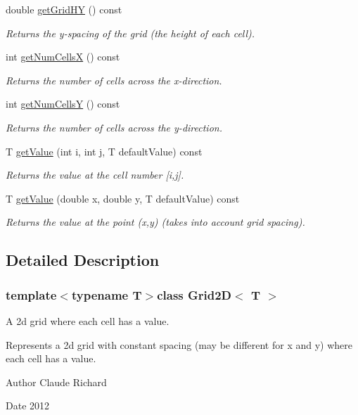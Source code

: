 \begin{DoxyCompactItemize}
double \hyperlink{class_grid2_d_a23b8af0f8e33c530bd1afbc5c77c50e2}{get\-Grid\-H\-Y} () const 
\begin{DoxyCompactList}\small\item\em Returns the y-\/spacing of the grid (the height of each cell). \end{DoxyCompactList}\item 
int \hyperlink{class_grid2_d_a2b6c57bd0364ec5ec86ac5adf84bcbc5}{get\-Num\-Cells\-X} () const 
\begin{DoxyCompactList}\small\item\em Returns the number of cells across the x-\/direction. \end{DoxyCompactList}\item 
int \hyperlink{class_grid2_d_aaa3fd3dbe8e175ae01bf51af3dac72bc}{get\-Num\-Cells\-Y} () const 
\begin{DoxyCompactList}\small\item\em Returns the number of cells across the y-\/direction. \end{DoxyCompactList}\item 
T \hyperlink{class_grid2_d_a35171b27de35bf8ea47437e35a06ada7}{get\-Value} (int i, int j, T default\-Value) const 
\begin{DoxyCompactList}\small\item\em Returns the value at the cell number \mbox{[}i,j\mbox{]}. \end{DoxyCompactList}\item 
T \hyperlink{class_grid2_d_aa40e58a8322d1abf80f7479cc86f7dda}{get\-Value} (double x, double y, T default\-Value) const 
\begin{DoxyCompactList}\small\item\em Returns the value at the point (x,y) (takes into account grid spacing). \end{DoxyCompactList}\end{DoxyCompactItemize}


\subsection{Detailed Description}
\subsubsection*{template$<$typename T$>$class Grid2\-D$<$ T $>$}

A 2d grid where each cell has a value. 

Represents a 2d grid with constant spacing (may be different for x and y) where each cell has a value. \begin{DoxyAuthor}{Author}
Claude Richard 
\end{DoxyAuthor}
\begin{DoxyDate}{Date}
2012 
\end{DoxyDate}


